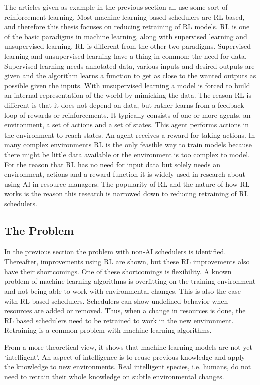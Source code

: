 The articles given as example in the previous section all use some sort of
reinforcement learning. Most machine learning based schedulers are RL based,
and therefore this thesis focuses on reducing retraining of RL models. RL is
one of the basic paradigms in machine learning, along with supervised learning
and unsupervised learning. RL is different from the other two paradigms.
Supervised learning and unsupervised learning have a thing in common: the need
for data. Supervised learning needs annotated data, various inputs and desired
outputs are given and the algorithm learns a function to get as close to the
wanted outputs as possible given the inputs. With unsupervised learning a
model is forced to build an internal representation of the world by mimicking
the data. The reason RL is different is that it does not depend on data, but
rather learns from a feedback loop of rewards or reinforcements. It typically
consists of one or more agents, an environment, a set of actions and a set of
states. This agent performs actions in the environment to reach states. An
agent receives a reward for taking actions. In many complex environments RL is
the only feasible way to train models because there might be little data
available or the environment is too complex to model. For the reason that RL
has no need for input data but solely needs an environment, actions and a reward
function it is widely used in research about using AI in resource managers.
The popularity of RL and the nature of how RL works is the reason this
research is narrowed down to reducing retraining of RL schedulers.


\subsection{The Problem}

In the previous section the problem with non-AI schedulers is identified.
Thereafter, improvements using RL are shown, but these RL improvements also
have their shortcomings. One of these shortcomings is flexibility. A known
problem of machine learning algorithms is overfitting on the training
environment and not being able to work with environmental changes. This is
also the case with RL based schedulers. Schedulers can show undefined
behavior when resources are added or removed. Thus, when a change in resources
is done, the RL based schedulers need to be retrained to work in the new
environment. Retraining is a common problem with machine learning algorithms.

From a more theoretical view, it shows that machine learning models are not
yet `intelligent'. An aspect of intelligence is to reuse previous knowledge
and apply the knowledge to new environments. Real intelligent species, i.e.
humans, do not need to retrain their whole knowledge on subtle environmental
changes.

